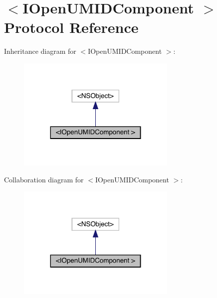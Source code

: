 \hypertarget{protocol_i_open_u_m_i_d_component_01-p}{}\section{$<$I\+Open\+U\+M\+I\+D\+Component $>$ Protocol Reference}
\label{protocol_i_open_u_m_i_d_component_01-p}


Inheritance diagram for $<$I\+Open\+U\+M\+I\+D\+Component $>$\+:\nopagebreak
\begin{figure}[H]
\begin{center}
\leavevmode
\includegraphics[width=215pt]{protocol_i_open_u_m_i_d_component_01-p__inherit__graph}
\end{center}
\end{figure}


Collaboration diagram for $<$I\+Open\+U\+M\+I\+D\+Component $>$\+:\nopagebreak
\begin{figure}[H]
\begin{center}
\leavevmode
\includegraphics[width=215pt]{protocol_i_open_u_m_i_d_component_01-p__coll__graph}
\end{center}
\end{figure}
